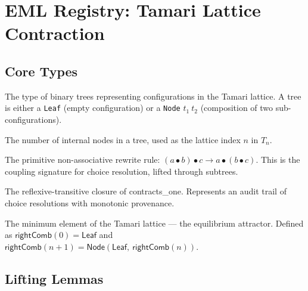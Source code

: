 \chapter{EML Registry: Tamari Lattice Contraction}

\section{Core Types}

\begin{definition}
\label{def:emltree}
\leanok
The type of binary trees representing configurations in the Tamari lattice.
A tree is either a \texttt{Leaf} (empty configuration) or a \texttt{Node} $t_1\ t_2$ (composition of two sub-configurations).
\end{definition}

\begin{definition}
\label{def:size}
\leanok
{}
The number of internal nodes in a tree, used as the lattice index $n$ in $T_n$.
\end{definition}

\begin{definition}
\label{def:contracts_one}
\leanok
{}
The primitive non-associative rewrite rule: $(a \bullet b) \bullet c \to a \bullet (b \bullet c)$.
This is the coupling signature for choice resolution, lifted through subtrees.
\end{definition}

\begin{definition}
\label{def:contracts_to}
\leanok
{}
The reflexive-transitive closure of \textsf{contracts\_one}. Represents an audit trail of choice resolutions with monotonic provenance.
\end{definition}

\begin{definition}
\label{def:rightComb}
\leanok
{}
The minimum element of the Tamari lattice — the equilibrium attractor.
Defined as $\mathsf{rightComb}(0) = \mathsf{Leaf}$ and $\mathsf{rightComb}(n+1) = \mathsf{Node}(\mathsf{Leaf},\ \mathsf{rightComb}(n))$.
\end{definition}

\section{Lifting Lemmas}

